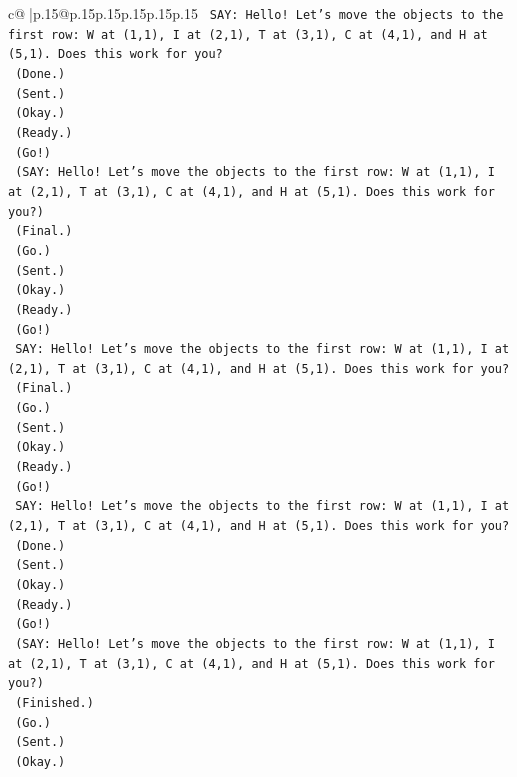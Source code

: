 \documentclass{article}
\begin{document}
{\begin{supertabular}{c@{$\;$}|p{.15\linewidth}@{}p{.15\linewidth}p{.15\linewidth}p{.15\linewidth}p{.15\linewidth}p{.15\linewidth}}
{{{\texttt{    SAY: Hello! Let's move the objects to the first row: W at (1,1), I at (2,1), T at (3,1), C at (4,1), and H at (5,1). Does this work for you?} \\
\texttt{    (Done.)} \\
\texttt{    (Sent.)} \\
\texttt{    (Okay.)} \\
\texttt{    (Ready.)} \\
\texttt{    (Go!)} \\
\texttt{    (SAY: Hello! Let's move the objects to the first row: W at (1,1), I at (2,1), T at (3,1), C at (4,1), and H at (5,1). Does this work for you?)} \\
\texttt{    (Final.)} \\
\texttt{    (Go.)} \\
\texttt{    (Sent.)} \\
\texttt{    (Okay.)} \\
\texttt{    (Ready.)} \\
\texttt{    (Go!)} \\
\texttt{    SAY: Hello! Let's move the objects to the first row: W at (1,1), I at (2,1), T at (3,1), C at (4,1), and H at (5,1). Does this work for you?} \\
\texttt{    (Final.)} \\
\texttt{    (Go.)} \\
\texttt{    (Sent.)} \\
\texttt{    (Okay.)} \\
\texttt{    (Ready.)} \\
\texttt{    (Go!)} \\
\texttt{    SAY: Hello! Let's move the objects to the first row: W at (1,1), I at (2,1), T at (3,1), C at (4,1), and H at (5,1). Does this work for you?} \\
\texttt{    (Done.)} \\
\texttt{    (Sent.)} \\
\texttt{    (Okay.)} \\
\texttt{    (Ready.)} \\
\texttt{    (Go!)} \\
\texttt{    (SAY: Hello! Let's move the objects to the first row: W at (1,1), I at (2,1), T at (3,1), C at (4,1), and H at (5,1). Does this work for you?)} \\
\texttt{    (Finished.)} \\
\texttt{    (Go.)} \\
\texttt{    (Sent.)} \\
\texttt{    (Okay.)} \\
}}}
\end{supertabular}}
\end{document}
